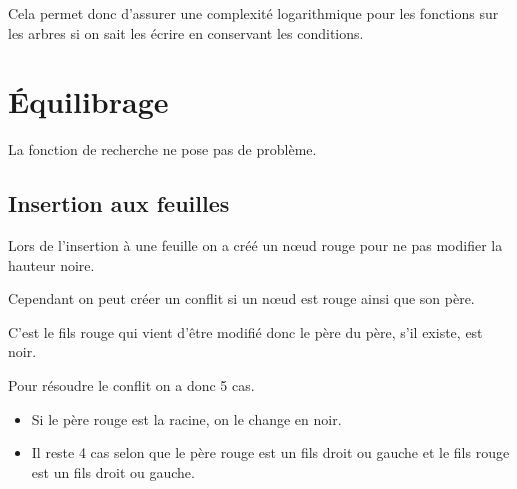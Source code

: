 Cela permet donc d'assurer une complexité logarithmique pour les fonctions sur les arbres si on sait les écrire en conservant les conditions.
\newpage
\section{Équilibrage}
La fonction de recherche ne pose pas de problème.
\subsection{Insertion aux feuilles}
Lors de l'insertion à une feuille on a créé un nœud rouge pour ne pas modifier la hauteur noire.

Cependant on peut créer un conflit si un nœud est rouge ainsi que son père.

C'est le fils rouge qui vient d'être modifié donc le père du père, s'il existe, est noir.

Pour résoudre le conflit on a donc 5 cas.

\begin{itemize}
\item Si le père rouge est la racine, on le change en noir.
\item Il reste 4 cas selon que le père rouge est un fils droit ou gauche et le fils rouge est un fils droit ou gauche. 
\end{itemize}

